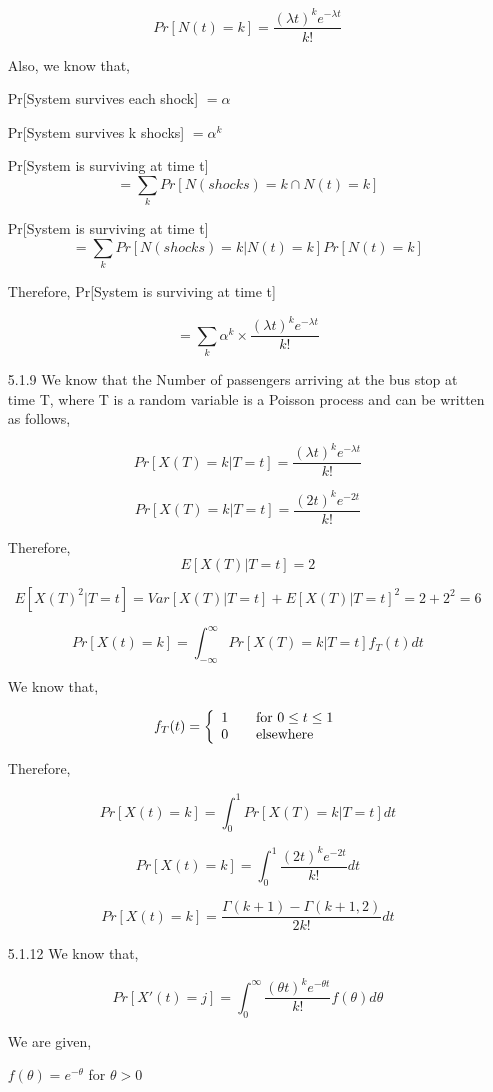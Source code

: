 \documentclass[a4paper,oneside,12pt]{report}
\begin{document}
\begin{enumerate}
	$$Pr[N(t) = k] = \frac{(\lambda t)^k e^{-\lambda t}}{k!}$$
	
	Also, we know that,
	
	Pr[System survives each shock] $= \alpha$
	
	Pr[System survives k shocks] $= \alpha^{k}$
	
	Pr[System is surviving at time t] $$= \sum_k{Pr[N(shocks) = k \cap N(t) = k]}$$
	
	Pr[System is surviving at time t] $$= \sum_k{Pr[N(shocks) = k|N(t) = k] Pr[N(t) = k]}$$
	
	Therefore, Pr[System is surviving at time t]
	
	$$ = \sum_k{\alpha^k \times \frac{(\lambda t)^k e^{-\lambda t}}{k!}}$$
	
	\item[5.1.9] We know that the Number of passengers arriving at the bus stop at time T, where T is a random variable  is a Poisson process and can be written as follows,
	
	$$Pr[X(T) = k|T = t] = \frac{(\lambda t)^k e^{-\lambda t}}{k!}$$
	
	$$Pr[X(T) = k|T = t] = \frac{(2 t)^k e^{-2 t}}{k!}$$
	
	Therefore, $$E[X(T)|T = t] = 2$$
	
	$$E[X(T)^2|T = t] = Var[X(T)|T = t] + E[X(T)|T = t]^2 = 2 + 2^2 = 6$$
	
	$$Pr[X(t) = k] = \int_{-\infty}^{\infty}{Pr[X(T) = k|T = t] f_T(t) dt}$$
	
	We know that,
	
	\[f_T(t) = \left\{ 
  \begin{array}{l l}
    1 & \quad \text{for $0 \leq t \leq 1$}\\
    0 & \quad \text{elsewhere}
  \end{array} \right.\]
	
	Therefore,
	
	$$Pr[X(t) = k] = \int_0^1{Pr[X(T) = k|T = t] dt}$$
	
	$$Pr[X(t) = k] = \int_0^1{\frac{(2 t)^k e^{-2 t}}{k!} dt}$$
	
	$$Pr[X(t) = k] = \frac{\Gamma(k + 1) - \Gamma(k + 1, 2)}{2k!} dt$$
	
	\item[5.1.12] We know that,
	
	$$Pr[X'(t) = j] = \int_0^{\infty}\frac{(\theta t)^k e^{-\theta t}}{k!} f(\theta) d\theta$$
	
	We are given,
	
	$f(\theta) = e^{-\theta}$ for $\theta > 0$
	

\end{enumerate}
\end{document}
